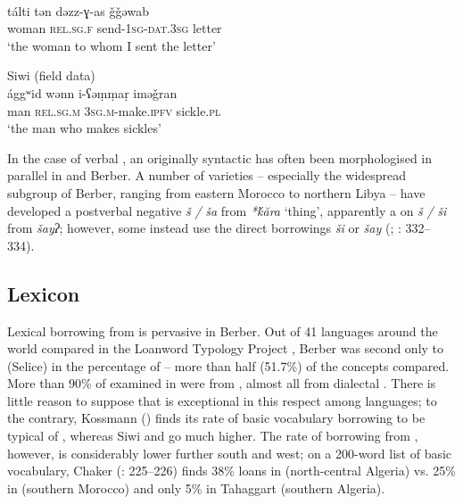 \documentclass[output=paper]{langsci/langscibook}
\begin{document}
\ea
{}\\
\gll tálti tən dəzz-ɣ{}-as ǧǧəwab\\
woman \textsc{rel.sg.f} send-\textsc{1sg-dat.3sg} letter\\
\glt `the woman to whom I sent the letter' \\
     \z
     
\ea
{ Siwi (field data)}\\
\gll ággʷid wənn i-ʕəṃṃaṛ iməǧran\\
man \textsc{rel.sg.m} \textsc{3sg.m}{}-make.\textsc{ipfv} sickle.\textsc{pl}\\
\glt `the man who makes sickles' 
\z

In the case of verbal , an originally syntactic  has often been morphologised in parallel in  and Berber. A number of varieties – especially the widespread  subgroup of Berber, ranging from eastern Morocco to northern Libya – have developed a postverbal negative  \textit{š} \textit{/} \textit{ša} from \textit{*\'{k}ăra} `thing', apparently a  on  \textit{š} \textit{/} \textit{ši} from \textit{šayʔ}; however, some instead use the direct borrowings \textit{ši} or \textit{šay} (\citealt{Lucas2007}; \citealt{Kossmann2013book}: 332–334).


 
 \subsection{Lexicon}


Lexical borrowing from  is pervasive in Berber. Out of 41 languages around the world compared in the Loanword Typology Project \citep{Tadmor2009},  Berber was second only to (Selice)  in the percentage of  – more than half (51.7\%) of the concepts compared. More than 90\% of  examined in  were from , almost all from dialectal  .  There is little reason to suppose that  is exceptional in this respect among  languages; to the contrary, Kossmann (\citeyear[110]{Kossmann2013book}) finds its rate of basic vocabulary borrowing to be typical of , whereas Siwi and  go much higher. The rate of borrowing from , however, is considerably lower further south and west; on a 200-word list of basic vocabulary, Chaker (\citeyear{Chaker1984}: 225–226) finds 38\%  loans in  (north-central Algeria) vs. 25\% in  (southern Morocco) and only 5\% in Tahaggart  (southern Algeria).
\end{document}
